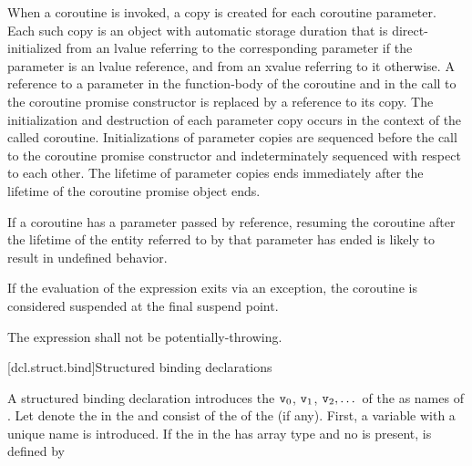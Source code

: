 \pnum
When a coroutine is invoked, a copy is created for each coroutine parameter.
Each such copy is an object with automatic storage duration that is
direct-initialized from an lvalue referring to the corresponding parameter if
the parameter is an lvalue reference, and from an xvalue referring to it
otherwise. A reference to a parameter in the function-body of the coroutine
and in the call to the coroutine promise constructor is replaced by a
reference to its copy.
The initialization and destruction of each parameter copy occurs in the
context of the called coroutine.
Initializations of parameter copies are sequenced before the call to the
coroutine promise constructor and indeterminately sequenced with respect to
each other.
The lifetime of parameter copies ends immediately after the lifetime of the
coroutine promise object ends.
\begin{note}
If a coroutine has a parameter passed by reference, resuming the coroutine
after the lifetime of the entity referred to by that parameter has ended is
likely to result in undefined behavior.
\end{note}

\pnum
If the evaluation of the expression
 exits via an exception,
the coroutine is considered suspended at the final suspend point.

\pnum
The expression  
shall not be potentially-throwing.

[dcl.struct.bind]{Structured binding declarations}%
%
%

\pnum
A structured binding declaration introduces the 
$\texttt{v}_0$, $\texttt{v}_1$, $\texttt{v}_2, \dotsc$
of the
 as names
of .
Let \cv{} denote the  in
the  and
 consist of the  of
the  (if any).
First, a variable with a unique name  is introduced. If the
 in the 
has array type  and no  is present,
 is defined by

\begin{ncbnf}
  \cv{}   \terminal{;}
\end{ncbnf}

